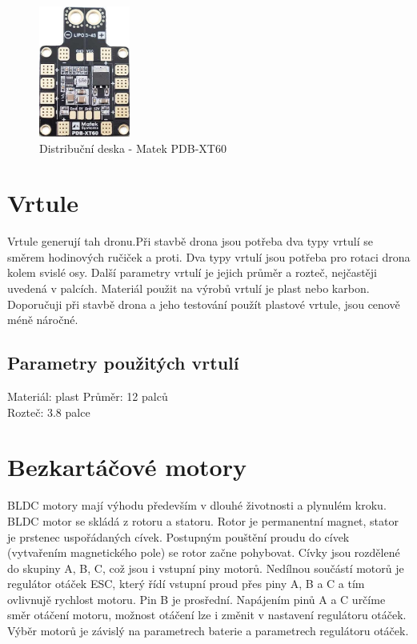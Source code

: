 \begin{figure}[h]
	\centering
	\includegraphics[width=3cm]{pictures/pdb.jpg}
	\caption{Distribuční deska - Matek PDB-XT60}
\end{figure}

\section{Vrtule} 
Vrtule generují tah dronu.Při stavbě drona jsou potřeba dva typy vrtulí se směrem hodinových ručiček a proti. Dva typy vrtulí jsou potřeba pro rotaci drona kolem svislé osy. Další parametry vrtulí je jejich průměr a rozteč, nejčastěji uvedená v palcích. Materiál použit na výrobů vrtulí je plast nebo karbon. Doporučuji při stavbě drona a jeho testování použít plastové vrtule, jsou cenově méně náročné.

\subsection{Parametry použitých vrtulí} 
Materiál: plast
Průměr: 12 palců\\
Rozteč: 3.8 palce\\

\section{Bezkartáčové motory} 
BLDC motory mají výhodu především v dlouhé životnosti a plynulém kroku. BLDC motor se skládá z rotoru a statoru. Rotor je permanentní magnet, stator je prstenec uspořádaných cívek. Postupným pouštění proudu do cívek (vytvařením magnetického pole) se rotor začne pohybovat. Cívky jsou rozdělené do skupiny A, B, C, což jsou i vstupní piny motorů.  Nedílnou součástí motorů je regulátor otáček ESC, který řídí vstupní proud přes piny A, B a C a tím ovlivnujě rychlost motoru.
Pin B je prosřední. Napájením pinů A a C určíme směr otáčení motoru, možnost otáčení lze i změnit v nastavení regulátoru otáček.
Výběr motorů je závislý na parametrech baterie a parametrech regulátoru otáček.

